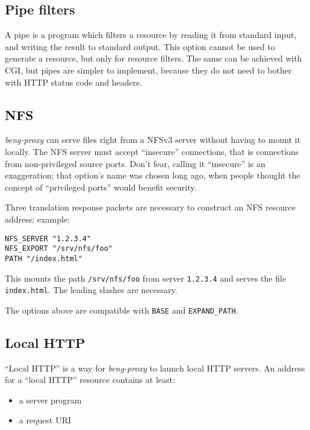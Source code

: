 \documentclass[a4paper,12pt]{article}
\begin{document}
\subsection{Pipe filters}
\label{pipe}

A pipe is a program which filters a resource by reading it from
standard input, and writing the result to standard output.  This
option cannot be used to generate a resource, but only for resource
filters.  The same can be achieved with CGI, but pipes are simpler to
implement, because they do not need to bother with HTTP status code
and headers.

\subsection{NFS}
\label{nfs}

\emph{beng-proxy} can serve files right from a NFSv3 server without
having to mount it locally.  The NFS server must accept ``insecure''
connections, that is connections from non-privileged source ports.
Don't fear, calling it ``insecure'' is an exaggeration; that option's
name was chosen long ago, when people thought the concept of
``privileged ports'' would benefit security.

Three translation response packets are necessary to construct an NFS
resource address; example:

\begin{verbatim}
NFS_SERVER "1.2.3.4"
NFS_EXPORT "/srv/nfs/foo"
PATH "/index.html"
\end{verbatim}

This mounts the path \texttt{/srv/nfs/foo} from server
\texttt{1.2.3.4} and serves the file \texttt{index.html}.  The
leading slashes are necessary.

The options above are compatible with \verb|BASE| and
\verb|EXPAND_PATH|.

\subsection{Local HTTP}
\label{lhttp}

``Local HTTP'' is a way for \emph{beng-proxy} to launch local HTTP
servers.  An address for a ``local HTTP'' resource contains at least:

\begin{itemize}
\item a server program
\item a request URI
\end{itemize}
\end{document}
